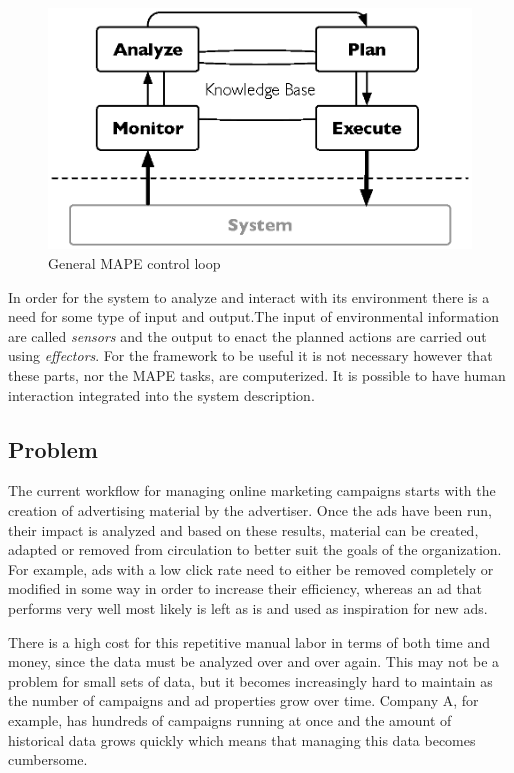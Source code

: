 \documentclass{sig-alternate}
\begin{document}
\begin{figure}[htb]
	\centering
	\includegraphics[width=\columnwidth]{mape.eps}
	\caption{General MAPE control loop}
	\label{fig:MAPE}
\end{figure}

In order for the system to analyze and interact with its environment there is a need for some type of input and output.The input of environmental information are called \textit{sensors} and the output to enact the planned actions are carried out using \textit{effectors}. For the framework to be useful it is not necessary however that these parts, nor the MAPE tasks, are computerized. It is possible to have human interaction integrated into the system description.

\subsection{Problem}
The current workflow for managing online marketing campaigns starts with the creation of advertising material by the advertiser. Once the ads have been run, their impact is analyzed and based on these results, material can be created, adapted or removed from circulation to better suit the goals of the organization. For example, ads with a low click rate need to either be removed completely or modified in some way in order to increase their efficiency, whereas an ad that performs very well most likely is left as is and used as inspiration for new ads.

There is a high cost for this repetitive manual labor in terms of both time and money, since the data must be analyzed over and over again. This may not be a problem for small sets of data, but it becomes increasingly hard to maintain as the number of campaigns and ad properties grow over time. Company A, for example, has hundreds of campaigns running at once and the amount of historical data grows quickly which means that managing this data becomes cumbersome.
\end{document}
